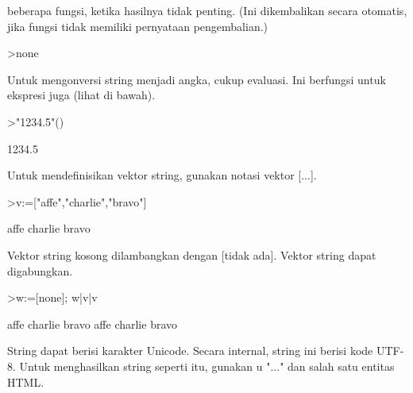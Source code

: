 \documentclass[a4paper,10pt]{article}
\begin{document}
\begin{eulernotebook}
\begin{eulercomment}
beberapa fungsi, ketika hasilnya tidak penting. (Ini dikembalikan
secara otomatis, jika fungsi tidak memiliki pernyataan pengembalian.)
\end{eulercomment}
\begin{eulerprompt}
>none
\end{eulerprompt}
\begin{eulercomment}
Untuk mengonversi string menjadi angka, cukup evaluasi. Ini berfungsi
untuk ekspresi juga (lihat di bawah).
\end{eulercomment}
\begin{eulerprompt}
>"1234.5"()
\end{eulerprompt}
\begin{euleroutput}
  1234.5
\end{euleroutput}
\begin{eulercomment}
Untuk mendefinisikan vektor string, gunakan notasi vektor [...].
\end{eulercomment}
\begin{eulerprompt}
>v:=["affe","charlie","bravo"]
\end{eulerprompt}
\begin{euleroutput}
  affe
  charlie
  bravo
\end{euleroutput}
\begin{eulercomment}
Vektor string kosong dilambangkan dengan [tidak ada]. Vektor string
dapat digabungkan.
\end{eulercomment}
\begin{eulerprompt}
>w:=[none]; w|v|v
\end{eulerprompt}
\begin{euleroutput}
  affe
  charlie
  bravo
  affe
  charlie
  bravo
\end{euleroutput}
\begin{eulercomment}
String dapat berisi karakter Unicode. Secara internal, string ini
berisi kode UTF-8. Untuk menghasilkan string seperti itu, gunakan u
"..." dan salah satu entitas HTML.


\end{eulercomment}
\end{eulernotebook}
\end{document}
